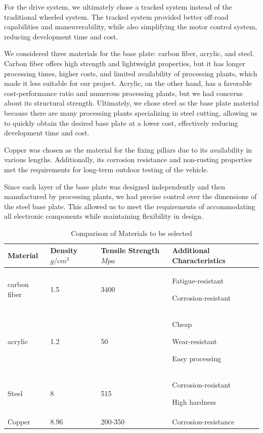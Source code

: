 \documentclass[12pt, a4paper, oneside]{report}
\begin{document}
For the drive system, we ultimately chose a tracked system instead of the traditional wheeled system. The tracked system provided better off-road capabilities and maneuverability, while also simplifying the motor control system, reducing development time and cost.

We considered three materials for the base plate: carbon fiber, acrylic, and steel. Carbon fiber offers high strength and lightweight properties, but it has longer processing times, higher costs, and limited availability of processing plants, which made it less suitable for our project. Acrylic, on the other hand, has a favorable cost-performance ratio and numerous processing plants, but we had concerns about its structural strength. Ultimately, we chose steel as the base plate material because there are many processing plants specializing in steel cutting, allowing us to quickly obtain the desired base plate at a lower cost, effectively reducing development time and cost.

Copper was chosen as the material for the fixing pillars due to its availability in various lengths. Additionally, its corrosion resistance and non-rusting properties met the requirements for long-term outdoor testing of the vehicle.

Since each layer of the base plate was designed independently and then manufactured by processing plants, we had precise control over the dimensions of the steel base plate. This allowed us to meet the requirements of accommodating all electronic components while maintaining flexibility in design.
\begin{table}[h!]
  \begin{center}
    \caption{Comparison of Materials to be selected}
    \begin{tabularx}{\textwidth}{|X|X|X|X|}
      \hline      
      \textbf{Material} & \textbf{Density $g/{cm}^3$} & \textbf{Tensile Strength $Mpa$} & \textbf{Additional Characteristics}\\
      \hline
      carbon fiber & 1.5 & 3400 & Fatigue-resistant 
      
      Corrosion-resistant\\
      \hline
      acrylic & 1.2 & 50 & Cheap 
      
      Wear-resistant 
      
      Easy processing\\
      \hline
      Steel & 8 & 515 &  Corrosion-resistant 
      
      High hardness\\
      \hline
      Copper & 8.96 & 200-350 & Corrosion-resistance\\
      \hline
    \end{tabularx}
  \end{center}
\end{table}
\newpage
\end{document}
